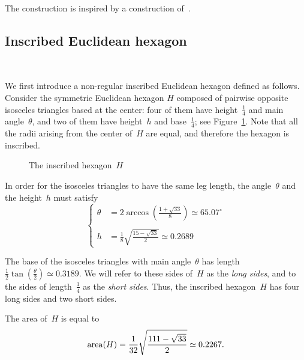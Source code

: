 \documentclass[12pt,reqno]{amsart}
\theoremstyle{definition}
\numberwithin{equation}{section}
\DeclareMathOperator{\area}{{\rm area}}
\numberwithin{equation}{section}
\begin{document}
\forgotten



The construction is inspired by a construction of~\cite{KS15}.  

\subsection{Inscribed Euclidean hexagon}
\label{s51}

\mbox{ } \medskip

We first introduce a non-regular inscribed Euclidean hexagon defined as
follows.  Consider the symmetric Euclidean hexagon $H$ composed of
pairwise opposite isosceles triangles based at the center: four of
them have height~$\frac{1}{4}$ and main angle~$\theta$, and two of
them have height~$h$ and base~$\frac{1}{4}$; see Figure~\ref{fig:H}.
Note that all the radii arising from the center of~$H$ are equal, and therefore the hexagon is inscribed.


\begin{figure}[htbp!] 
\vspace{1.5cm}
\def\svgwidth{3.5cm}
 
\vspace{0.2cm}
\caption{The inscribed hexagon~$H$} \label{fig:H}
\end{figure}

In order for the isosceles triangles to have the same leg length, the angle~$\theta$ and the height~$h$ must satisfy
\begin{equation} \label{eq:theta-h}
\left\{
\begin{array}{rl}
\theta & \displaystyle = 2 \arccos\left(\frac{1+\sqrt{33}}{8}\right) \simeq 65.07^\circ \\
 & \\
h & \displaystyle   = \frac{1}{8} \sqrt{\frac{15-\sqrt{33}}{2}} \simeq 0.2689
\end{array}
\right.
\end{equation}

The base of the isosceles triangles with main angle~$\theta$ has length $\frac{1}{2} \tan(\frac{\theta}{2}) \simeq 0.3189$.
We will refer to these sides of~$H$ as the \emph{long sides}, and to the sides of length~$\frac{1}{4}$ as the \emph{short sides}.
Thus, the inscribed hexagon~$H$ has four long sides and two short sides.

The area of~$H$ is equal to
\[
\area(H) = \frac{1}{32} \sqrt{\frac{111-\sqrt{33}}{2}} \simeq 0.2267.
\]
\end{document}
